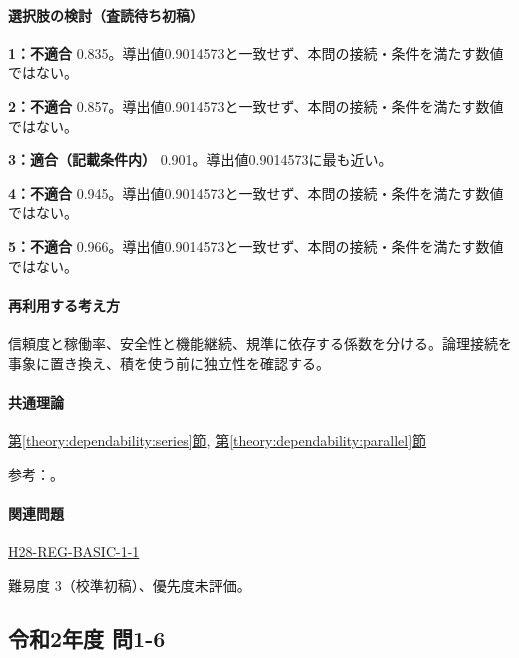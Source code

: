 \paragraph{選択肢の検討（査読待ち初稿）}\mbox{}\par

\noindent\textbf{1：不適合} 0.835。導出値0.9014573と一致せず、本問の接続・条件を満たす数値ではない。\par

\noindent\textbf{2：不適合} 0.857。導出値0.9014573と一致せず、本問の接続・条件を満たす数値ではない。\par

\noindent\textbf{3：適合（記載条件内）} 0.901。導出値0.9014573に最も近い。\par

\noindent\textbf{4：不適合} 0.945。導出値0.9014573と一致せず、本問の接続・条件を満たす数値ではない。\par

\noindent\textbf{5：不適合} 0.966。導出値0.9014573と一致せず、本問の接続・条件を満たす数値ではない。\par

\paragraph{再利用する考え方} 信頼度と稼働率、安全性と機能継続、規準に依存する係数を分ける。論理接続を事象に置き換え、積を使う前に独立性を確認する。

\paragraph{共通理論} \hyperref[theory:dependability:series]{第\ref*{theory:dependability:series}節}, \hyperref[theory:dependability:parallel]{第\ref*{theory:dependability:parallel}節}

\par 参考：\cite{reliability_nist_series,reliability_nist_parallel}。

\paragraph{関連問題} \hyperref[q:h28-reg-basic-1-1]{H28-REG-BASIC-1-1}

\par 難易度 3（校準初稿）、優先度未評価。

\subsection{令和2年度 問1-6}
\label{q:r02-reg-basic-1-6}

